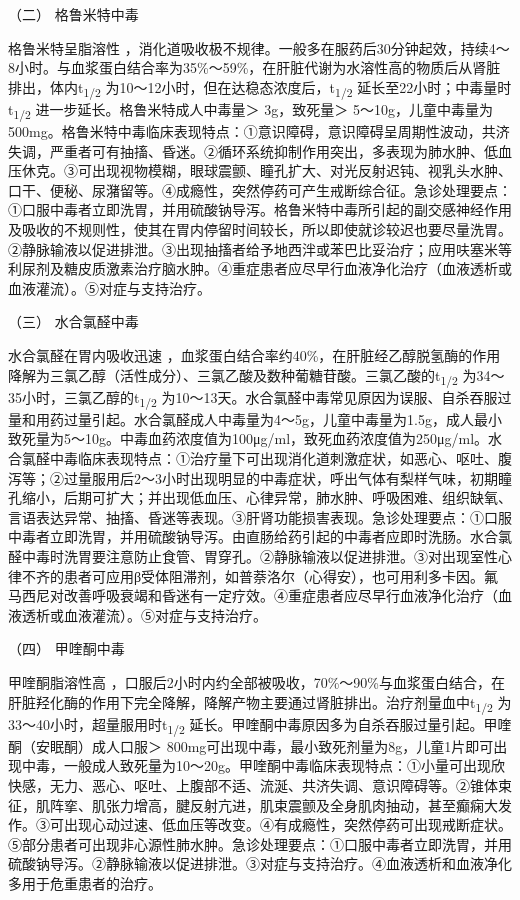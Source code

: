 \hypertarget{text00132.htmlux5cux23CHP5-2-2-3-2}{}
（二） 格鲁米特中毒

格鲁米特呈脂溶性
，消化道吸收极不规律。一般多在服药后30分钟起效，持续4～8小时。与血浆蛋白结合率为35\%～59\%，在肝脏代谢为水溶性高的物质后从肾脏排出，体内t\textsubscript{1/2}
为10～12小时，但在达稳态浓度后，t\textsubscript{1/2}
延长至22小时；中毒量时t\textsubscript{1/2}
进一步延长。格鲁米特成人中毒量＞ 3g，致死量＞
5～10g，儿童中毒量为500mg。格鲁米特中毒临床表现特点：①意识障碍，意识障碍呈周期性波动，共济失调，严重者可有抽搐、昏迷。②循环系统抑制作用突出，多表现为肺水肿、低血压休克。③可出现视物模糊，眼球震颤、瞳孔扩大、对光反射迟钝、视乳头水肿、口干、便秘、尿潴留等。④成瘾性，突然停药可产生戒断综合征。急诊处理要点：①口服中毒者立即洗胃，并用硫酸钠导泻。格鲁米特中毒所引起的副交感神经作用及吸收的不规则性，使其在胃内停留时间较长，所以即使就诊较迟也要尽量洗胃。②静脉输液以促进排泄。③出现抽搐者给予地西泮或苯巴比妥治疗；应用呋塞米等利尿剂及糖皮质激素治疗脑水肿。④重症患者应尽早行血液净化治疗（血液透析或血液灌流）。⑤对症与支持治疗。

\hypertarget{text00132.htmlux5cux23CHP5-2-2-3-3}{}
（三） 水合氯醛中毒

水合氯醛在胃内吸收迅速
，血浆蛋白结合率约40\%，在肝脏经乙醇脱氢酶的作用降解为三氯乙醇（活性成分）、三氯乙酸及数种葡糖苷酸。三氯乙酸的t\textsubscript{1/2}
为34～35小时，三氯乙醇的t\textsubscript{1/2}
为10～13天。水合氯醛中毒常见原因为误服、自杀吞服过量和用药过量引起。水合氯醛成人中毒量为4～5g，儿童中毒量为1.5g，成人最小致死量为5～10g。中毒血药浓度值为100μg/ml，致死血药浓度值为250μg/ml。水合氯醛中毒临床表现特点：①治疗量下可出现消化道刺激症状，如恶心、呕吐、腹泻等；②过量服用后2～3小时出现明显的中毒症状，呼出气体有梨样气味，初期瞳孔缩小，后期可扩大；并出现低血压、心律异常，肺水肿、呼吸困难、组织缺氧、言语表达异常、抽搐、昏迷等表现。③肝肾功能损害表现。急诊处理要点：①口服中毒者立即洗胃，并用硫酸钠导泻。由直肠给药引起的中毒者应即时洗肠。水合氯醛中毒时洗胃要注意防止食管、胃穿孔。②静脉输液以促进排泄。③对出现室性心律不齐的患者可应用β受体阻滞剂，如普萘洛尔（心得安），也可用利多卡因。氟马西尼对改善呼吸衰竭和昏迷有一定疗效。④重症患者应尽早行血液净化治疗（血液透析或血液灌流）。⑤对症与支持治疗。

\hypertarget{text00132.htmlux5cux23CHP5-2-2-3-4}{}
（四） 甲喹酮中毒

甲喹酮脂溶性高
，口服后2小时内约全部被吸收，70\%～90\%与血浆蛋白结合，在肝脏羟化酶的作用下完全降解，降解产物主要通过肾脏排出。治疗剂量血中t\textsubscript{1/2}
为33～40小时，超量服用时t\textsubscript{1/2}
延长。甲喹酮中毒原因多为自杀吞服过量引起。甲喹酮（安眠酮）成人口服＞
800mg可出现中毒，最小致死剂量为8g，儿童1片即可出现中毒，一般成人致死量为10～20g。甲喹酮中毒临床表现特点：①小量可出现欣快感，无力、恶心、呕吐、上腹部不适、流涎、共济失调、意识障碍等。②锥体束征，肌阵挛、肌张力增高，腱反射亢进，肌束震颤及全身肌肉抽动，甚至癫痫大发作。③可出现心动过速、低血压等改变。④有成瘾性，突然停药可出现戒断症状。⑤部分患者可出现非心源性肺水肿。急诊处理要点：①口服中毒者立即洗胃，并用硫酸钠导泻。②静脉输液以促进排泄。③对症与支持治疗。④血液透析和血液净化多用于危重患者的治疗。

